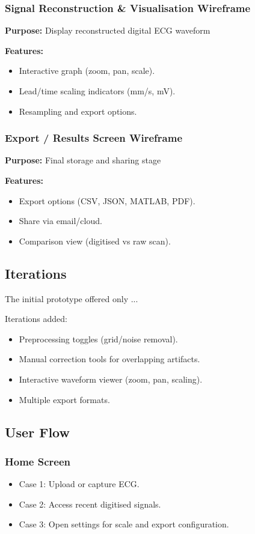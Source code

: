 \subsubsection{Signal Reconstruction \& Visualisation Wireframe}
\textbf{Purpose:} Display reconstructed digital ECG waveform

\textbf{Features:}
\begin{itemize}
    \item Interactive graph (zoom, pan, scale).
    \item Lead/time scaling indicators (mm/s, mV).
    \item Resampling and export options.
\end{itemize}

\subsubsection{Export / Results Screen Wireframe}
\textbf{Purpose:} Final storage and sharing stage

\textbf{Features:}
\begin{itemize}
    \item Export options (CSV, JSON, MATLAB, PDF).
    \item Share via email/cloud.
    \item Comparison view (digitised vs raw scan).
\end{itemize}

\subsection{Iterations}
The initial prototype offered only ... 

Iterations added:
\begin{itemize}
    \item Preprocessing toggles (grid/noise removal).
    \item Manual correction tools for overlapping artifacts.
    \item Interactive waveform viewer (zoom, pan, scaling).
    \item Multiple export formats.
\end{itemize}

\subsection{User Flow}

\subsubsection{Home Screen}
\begin{itemize}
    \item Case 1: Upload or capture ECG.
    \item Case 2: Access recent digitised signals.
    \item Case 3: Open settings for scale and export configuration.
\end{itemize}

